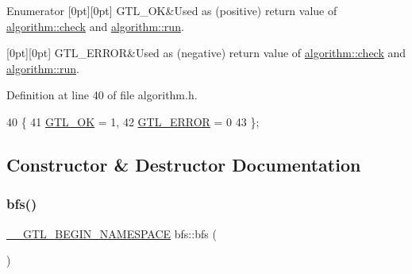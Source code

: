 \begin{DoxyEnumFields}{Enumerator}
[0pt][0pt]{}\mbox{\label{classalgorithm_af1a0078e153aa99c24f9bdf0d97f6710a5114c20e4a96a76b5de9f28bf15e282b}} 
G\+T\+L\+\_\+\+OK&Used as (positive) return value of \mbox{\hyperlink{classalgorithm_a76361fb03ad1cf643affc51821e43bed}{algorithm\+::check}} and \mbox{\hyperlink{classalgorithm_a734b189509a8d6b56b65f8ff772d43ca}{algorithm\+::run}}. \\
\hline

[0pt][0pt]{}\mbox{\label{classalgorithm_af1a0078e153aa99c24f9bdf0d97f6710a6fcf574690bbd6cf710837a169510dd7}} 
G\+T\+L\+\_\+\+E\+R\+R\+OR&Used as (negative) return value of \mbox{\hyperlink{classalgorithm_a76361fb03ad1cf643affc51821e43bed}{algorithm\+::check}} and \mbox{\hyperlink{classalgorithm_a734b189509a8d6b56b65f8ff772d43ca}{algorithm\+::run}}. \\
\hline

\end{DoxyEnumFields}


Definition at line 40 of file algorithm.\+h.


\begin{DoxyCode}
40          \{
41     \mbox{\hyperlink{classalgorithm_af1a0078e153aa99c24f9bdf0d97f6710a5114c20e4a96a76b5de9f28bf15e282b}{GTL\_OK}} = 1,
42     \mbox{\hyperlink{classalgorithm_af1a0078e153aa99c24f9bdf0d97f6710a6fcf574690bbd6cf710837a169510dd7}{GTL\_ERROR}} = 0
43     \};
\end{DoxyCode}


\subsection{Constructor \& Destructor Documentation}
\mbox{\label{classbfs_a21bcb84fc2db7cf5e789c0459e11c501}} 
\subsubsection{\texorpdfstring{bfs()}{bfs()}}
{\footnotesize\ttfamily \mbox{\hyperlink{_g_t_l_8h_a2d9f24096ac60918452dd51f32b64aa9}{\+\_\+\+\_\+\+G\+T\+L\+\_\+\+B\+E\+G\+I\+N\+\_\+\+N\+A\+M\+E\+S\+P\+A\+CE}} bfs\+::bfs (\begin{DoxyParamCaption}{ }\end{DoxyParamCaption})}



